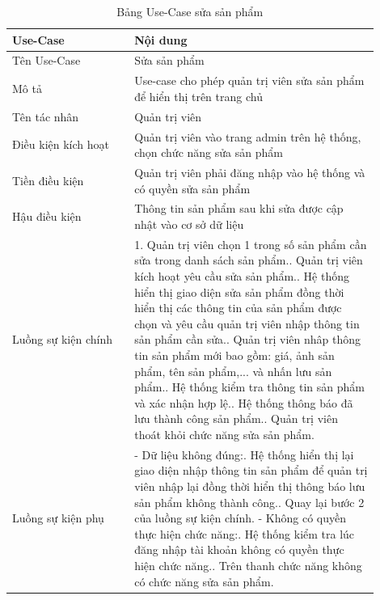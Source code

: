 \begin{longtable}[htp]{ |m{0.3\linewidth}|m{0.6\linewidth}|}
 \caption{Bảng Use-Case sửa sản phẩm \label{updateProduct}}\\
 \hline
 Use-Case & Nội dung \\
 \hline
 Tên Use-Case & Sửa sản phẩm \\
 \hline
 Mô tả & Use-case cho phép quản trị viên sửa sản phẩm để hiển thị trên trang chủ\\
 \hline
 Tên tác nhân & Quản trị viên\\
 \hline
 Điều kiện kích hoạt & Quản trị viên vào trang admin trên hệ thống, chọn chức năng sửa sản phẩm\\
 \hline
 Tiền điều kiện & Quản trị viên phải đăng nhập vào hệ thống và có quyền sửa sản phẩm\\
 \hline
 Hậu điều kiện & Thông tin sản phẩm sau khi sửa được cập nhật vào cơ sở dữ liệu\\
 \hline
 Luồng sự kiện chính & 
 1. Quản trị viên chọn 1 trong số sản phẩm cần sửa trong danh sách sản phẩm.\newline
 2. Quản trị viên kích hoạt yêu cầu sửa sản phẩm.\newline
 3. Hệ thống hiển thị giao diện sửa sản phẩm đồng thời hiển thị các thông tin của sản phẩm được chọn và yêu cầu quản trị viên nhập thông tin sản phẩm cần sửa.\newline
 4. Quản trị viên nhâp thông tin sản phẩm mới bao gồm: giá, ảnh sản phẩm, tên sản phẩm,... và nhấn lưu sản phẩm.\newline
 5. Hệ thống kiểm tra thông tin sản phẩm và xác nhận hợp lệ.\newline
 6. Hệ thống thông báo đã lưu thành công sản phẩm.\newline	
 7. Quản trị viên thoát khỏi chức năng sửa sản phẩm.
 \\
 \hline
 Luồng sự kiện phụ & 
 - Dữ liệu không đúng:\newline
  1. Hệ thống hiển thị lại giao diện nhập thông tin sản phẩm để quản trị viên nhập lại đồng thời hiển thị thông báo lưu sản phẩm không thành công.\newline
  2. Quay lại bước 2 của luồng sự kiện chính.\newline
  - Không có quyền thực hiện chức năng:\newline
  1. Hệ thống kiểm tra lúc đăng nhập tài khoản không có quyền thực hiện chức năng.\newline
  2. Trên thanh chức năng không có chức năng sửa sản phẩm.
 \\
 \hline
\end{longtable}
